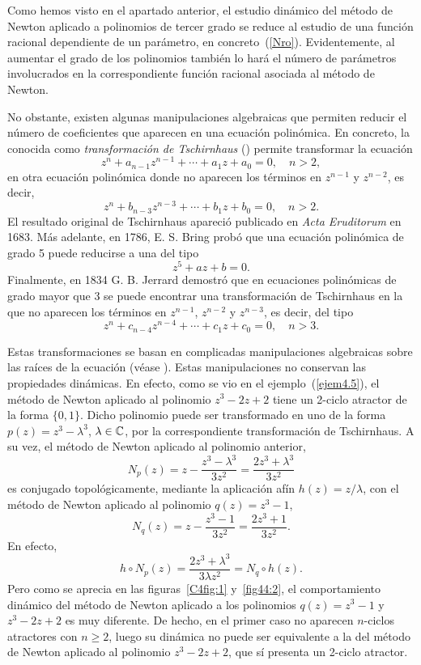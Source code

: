 Como hemos visto en el apartado anterior, el estudio dinámico del método de Newton aplicado a polinomios de tercer grado se reduce al estudio de una función racional dependiente de un parámetro, en concreto~(\ref{Nro}). Evidentemente, al aumentar el grado de los polinomios también lo hará el número de parámetros involucrados en la correspondiente función racional asociada al método de Newton.

No obstante, existen algunas manipulaciones algebraicas que permiten reducir el número de coeficientes que aparecen en una ecuación polinómica. En concreto, la conocida como \emph{transformación de Tschirnhaus} (\cite{Dickson}) permite transformar la ecuación
$$
z^n+a_{n-1}z^{n-1}+\cdots+a_{1}z+a_0=0, \quad n>2,
$$
en otra ecuación polinómica donde no aparecen los términos en $z^{n-1}$ y $z^{n-2}$, es decir,
$$
z^n+b_{n-3}z^{n-3}+\cdots+b_{1}z+b_0=0, \quad n>2.
$$
El resultado original de Tschirnhaus apareció publicado en \emph{Acta Eruditorum} en 1683. Más adelante, en 1786, E. S. Bring probó que una ecuación polinómica de grado 5 puede reducirse a una del tipo
$$
z^5+az+b=0.
$$
Finalmente, en 1834 G. B. Jerrard demostró que en ecuaciones polinómicas de grado mayor que 3 se puede encontrar  una transformación de Tschirnhaus en la que no aparecen los términos en $z^{n-1}$, $z^{n-2}$ y $z^{n-3}$, es decir, del tipo
$$
z^n+c_{n-4}z^{n-4}+\cdots+c_{1}z+c_0=0, \quad n>3.
$$

Estas transformaciones se basan en complicadas manipulaciones algebraicas sobre las raíces de la ecuación (véase \cite{WeissBJ}). Estas manipulaciones no conservan las propiedades dinámicas. En efecto, como se vio en el ejemplo~(\ref{ejem4.5}), el  método de Newton aplicado al polinomio $z^3-2z+2$ tiene un 2-ciclo atractor de la forma $\{0,1\}$. Dicho polinomio puede ser transformado en uno de la forma $p(z)=z^3-\lambda^3$, $\lambda\in \mathbb{C}$, por la correspondiente transformación de Tschirnhaus. A su vez, el método de Newton aplicado al polinomio anterior,
$$
N_p(z)=z-\frac{z^3-\lambda^3}{3z^2}=\frac{2z^3+\lambda^3}{3z^2}
$$
 es conjugado topológicamente, mediante la aplicación afín $h(z)=z/\lambda$, con el método de Newton aplicado al polinomio $q(z)=z^3-1$,
$$
N_q(z)=z-\frac{z^3-1}{3z^2}=\frac{2z^3+1}{3z^2}.
$$
En efecto,
$$
h\circ N_p(z)=\frac{2z^3+\lambda^3}{3\lambda z^2}=N_q\circ h(z).
$$
Pero como se aprecia en las figuras~\ref{C4fig:1} y~\ref{fig44:2}, el comportamiento dinámico del método de Newton aplicado a los polinomios $q(z)=z^3-1$ y $z^3-2z+2$ es muy diferente. De hecho, en el primer caso no aparecen $n$-ciclos atractores con $n\ge 2$, luego su dinámica no puede ser equivalente a la del método de Newton aplicado al polinomio $z^3-2z+2$, que sí presenta un 2-ciclo atractor.

